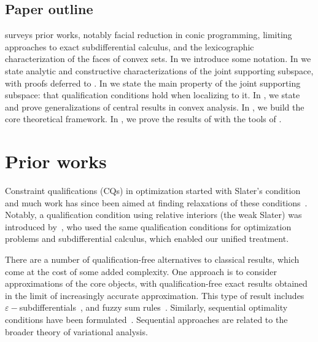 \documentclass{article}
\theoremstyle{plain}
\theoremstyle{definition}
\theoremstyle{remark}
\begin{document}
\subsection{Paper outline}
\label{loc:introduction_for_sub:differentials_additivity.statement.paper_outline}
 surveys prior works, notably facial reduction in conic programming, limiting approaches to exact subdifferential calculus, and the lexicographic characterization of the faces of convex sets. In  we introduce some notation. In  we state analytic and constructive characterizations of the joint supporting subspace, with proofs deferred to . In  we state the main property of the joint supporting subspace: that qualification conditions hold when localizing to it.
In , we state and prove generalizations of central results in convex analysis. In , we build the core theoretical framework. In , we prove the results of  with the tools of .
\section{Prior works}
\label{loc:body.prior_works}
Constraint qualifications (CQs) in optimization started with Slater's condition~\cite{slaterLagrangeMultipliersRevisited1959} and much work has since been aimed at finding relaxations of these conditions~\cite{mangasarianFritzJohnNecessary1967, abadieNonlinearProgramming1967, robinsonFirstOrderConditions1976}. 
Notably, a qualification condition using relative interiors (the weak Slater) was introduced by~\textcite{rockafellarConvexAnalysis1970}, who used the same qualification conditions for optimization
problems and subdifferential calculus, which
enabled our unified treatment.

There are a number of qualification-free alternatives to classical results, which come at the cost of some added complexity. One approach is to consider approximations of the core objects, with qualification-free exact results obtained in the limit of increasingly accurate approximation. This type of result includes $\varepsilon-$subdifferentials~\cite{hiriarturruty_SubdifferentialCalculusUsing_1993}, and fuzzy sum rules~\cite{ioffeFuzzyPrinciplesCharacterization1998, jules_FormulasSubdifferentialsSums_2002}.
Similarly, sequential optimality conditions have been formulated~\cite{thibaultSequentialConvexSubdifferential1997, jeyakumarInequalitySystemsGlobal1996}. Sequential approaches are related to the broader theory of variational analysis.
\end{document}
